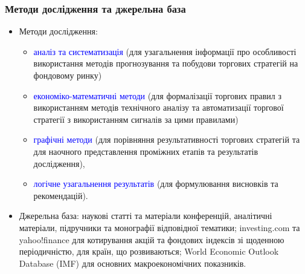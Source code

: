 \documentclass[aspectratio=169]{beamer}
\begin{document}
\begin{frame}
\frametitle{Методи дослідження та джерельна база}
\begin{itemize}
\item \alert {Методи дослідження}: 
\begin{itemize}
    \item[\textcolor{orange}{\textbullet}] \textcolor{blue} {аналіз та систематизація} (для узагальнення інформації про особливості використання методів прогнозування та побудови торгових стратегій на фондовому ринку)
    \item[\textcolor{orange}{\textbullet}] \textcolor{blue} {економіко-математичні методи} (для формалізації торгових правил з використанням методів технічного аналізу та автоматизації торгової стратегії з використанням сигналів за цими правилами) 
    \item[\textcolor{orange}{\textbullet}] \textcolor{blue} {графічні методи} (для порівняння результативності торгових стратегій та для наочного представлення проміжних етапів та результатів дослідження), \item[\textcolor{orange}{\textbullet}] \textcolor{blue} {логічне узагальнення результатів} (для формулювання висновків та рекомендацій).
\end{itemize}
\tinyskip
\item \alert {Джерельна база}: наукові статті та матеріали конференцій, аналітичні матеріали, підручники та монографії відповідної тематики; investing.com та yahoo!finance для котирування акцій та фондових індексів зі щоденною періодичністю, для країн, що розвиваються; World Economic Outlook Database (IMF) для основних макроекономічних показників.
\end{itemize}
\end{frame}
\end{document}
